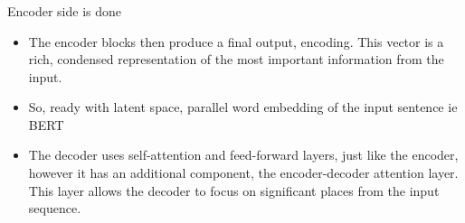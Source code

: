 
			
			
		


			
			
		



			
		


\begin{frame}[fragile]\frametitle{}
\begin{center}
{\Large Encoder side is done}
\end{center}

\begin{itemize}
\item The encoder blocks then produce a final output, encoding. This vector is a rich, condensed representation of the most important information from the input.
\item So, ready with latent space, parallel word embedding of the input sentence ie BERT
\item The decoder uses self-attention and feed-forward layers, just like the encoder, however it has an additional component, the encoder-decoder attention layer. This layer allows the decoder to focus on significant places from the input sequence.
\end{itemize}

\end{frame}





